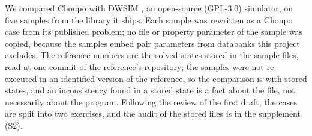 \documentclass[preprint,12pt]{elsarticle}
\begin{document}
We compared Choupo with DWSIM \citep{dwsim}, an open-source (GPL-3.0)
simulator, on five samples from the library it ships.  Each sample was
rewritten as a Choupo case from its published problem; no file or
property parameter of the sample was copied, because the samples embed
pair parameters from databanks this project excludes.  The reference
numbers are the solved states stored in the sample files, read at one
commit of the reference's repository; the samples were not re-executed in
an identified version of the reference, so the comparison is with stored
states, and an inconsistency found in a stored state is a fact about the
file, not necessarily about the program.  Following the review of the
first draft, the cases are split into two exercises, and the audit of the
stored files is in the supplement (S2).
\end{document}
